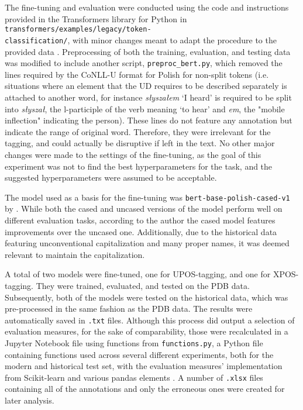 The fine-tuning and evaluation were conducted using the code and instructions provided in the Transformers library for Python in \texttt{transformers/examples/legacy/token-\\classification/}, with minor changes meant to adapt the procedure to the provided data  \citep{wolf-etal-2020-transformers}. Preprocessing of both the training, evaluation, and testing data was modified to include another script, \texttt{preproc\_bert.py}, which removed the lines required by the CoNLL-U format for Polish for non-split tokens (i.e. situations where an element that the UD requires to be described separately is attached to another word, for instance \textit{słyszałem} `I heard' is required to be split into \textit{słyszał}, the l-participle of the verb meaning `to hear' and \textit{em}, the "mobile inflection" indicating the person). These lines do not feature any annotation but indicate the range of original word. Therefore, they were irrelevant for the tagging, and could actually be disruptive if left in the text. No other major changes were made to the settings of the fine-tuning, as the goal of this experiment was not to find the best hyperparameters for the task, and the suggested hyperparameters were assumed to be acceptable.

The model used as a basis for the fine-tuning was \texttt{bert-base-polish-cased-v1} by \citet{kłeczek_2021}. While both the cased and uncased versions of the model perform well on different evaluation tasks, according to the author the cased model features improvements over the uncased one. Additionally, due to the historical data featuring unconventional capitalization and many proper names, it was deemed relevant to maintain the capitalization.

A total of two models were fine-tuned, one for UPOS-tagging, and one for XPOS-tagging. They were trained, evaluated, and tested on the PDB data. Subsequently, both of the models were tested on the historical data, which was pre-processed in the same fashion as the PDB data. The results were automatically saved in \texttt{.txt} files. Although this process did output a selection of evaluation measures, for the sake of comparability, those were recalculated in a Jupyter Notebook file using functions from \texttt{functions.py}, a Python file containing functions used across several different experiments, both for the modern and historical test set, with the evaluation measures' implementation from Scikit-learn and various pandas elements \citep{scikit-learn, reback2020pandas, mckinney-proc-scipy-2010}. A number of \texttt{.xlsx} files containing all of the annotations and only the erroneous ones were created for later analysis.  

